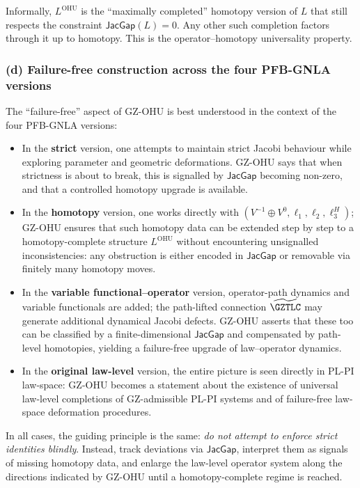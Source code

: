 \documentclass[11pt]{book}
\theoremstyle{plain}
\theoremstyle{definition}
\begin{document}
Informally, $L^{\mathrm{OHU}}$ is the “maximally completed” homotopy
version of $L$ that still respects the constraint
$\mathsf{JacGap}(L)=0$. Any other such completion factors through it
up to homotopy. This is the operator--homotopy universality property.

\subsubsection*{(d) Failure-free construction across the four PFB-GNLA versions}

The “failure-free” aspect of GZ-OHU is best understood in the context
of the four PFB-GNLA versions:

\begin{itemize}
  \item In the \textbf{strict} version, one attempts to maintain
        strict Jacobi behaviour while exploring parameter and geometric
        deformations. GZ-OHU says that when strictness is about to
        break, this is signalled by $\mathsf{JacGap}$ becoming
        non-zero, and that a controlled homotopy upgrade is available.
  \item In the \textbf{homotopy} version, one works directly with
        $(V^{-1}\oplus V^0,\ell_1,\ell_2,\ell_3^H)$; GZ-OHU ensures
        that such homotopy data can be extended step by step to a
        homotopy-complete structure $L^{\mathrm{OHU}}$ without
        encountering unsignalled inconsistencies: any obstruction is
        either encoded in $\mathsf{JacGap}$ or removable via finitely
        many homotopy moves.
  \item In the \textbf{variable functional--operator} version,
        operator-path dynamics and variable functionals are added; the
        path-lifted connection $\widetilde{\GZTLC}$ may generate
        additional dynamical Jacobi defects. GZ-OHU asserts that
        these too can be classified by a finite-dimensional
        $\mathsf{JacGap}$ and compensated by path-level homotopies,
        yielding a failure-free upgrade of law--operator dynamics.
  \item In the \textbf{original law-level} version, the entire
        picture is seen directly in PL-PI law-space: GZ-OHU becomes a
        statement about the existence of universal law-level completions
        of GZ-admissible PL-PI systems and of failure-free law-space
        deformation procedures.
\end{itemize}

In all cases, the guiding principle is the same: \emph{do not attempt
to enforce strict identities blindly}. Instead, track deviations via
$\mathsf{JacGap}$, interpret them as signals of missing homotopy data,
and enlarge the law-level operator system along the directions indicated
by GZ-OHU until a homotopy-complete regime is reached.
\end{document}
